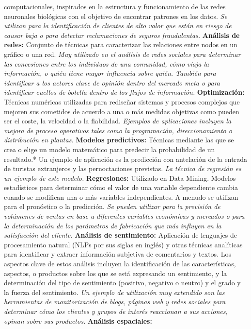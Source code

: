 \documentclass[
  letterpaper,
  DIV=11,
  numbers=noendperiod]{scrreprt}
\begin{document}
computacionales, inspirados en la estructura y funcionamiento de las
redes neuronales biológicas con el objetivo de encontrar patrones en los
datos. \emph{Se utilizan para la identificación de clientes de alto
valor que están en riesgo de causar baja o para detectar reclamaciones
de seguros fraudulentas.} \textbf{Análisis de redes:} Conjunto de
técnicas para caracterizar las relaciones entre nodos en un gráfico o
una red. \emph{Muy utilizado en el análisis de redes sociales para
determinar las concesiones entre los individuos de una comunidad, cómo
viaja la información, o quién tiene mayor influencia sobre quién.
También para identificar a los actores clave de opinión dentro del
mercado meta o para identificar cuellos de botella dentro de los flujos
de información.} \textbf{Optimización:} Técnicas numéricas utilizadas
para rediseñar sistemas y procesos complejos que mejoren sus cometidos
de acuerdo a una o más medidas objetivas como pueden ser el coste, la
velocidad o la fiabilidad. \emph{Ejemplos de aplicaciones incluyen la
mejora de proceso operativos tales como la programación,
direccionamiento o distribución en plantas.} \textbf{Modelos
predictivos:} Técnicas mediante las que se crea o elige un modelo
matemático para predecir la probabilidad de un resultado.* Un ejemplo de
aplicación es la predicción con antelación de la entrada de turistas
extranjeros y las pernoctaciones previstas. \emph{La técnica de
regresión es un ejemplo de este modelo.} \textbf{Regresiones:} Utilizado
en Data Mining. Modelos estadísticos para determinar cómo el valor de
una variable dependiente cambia cuando se modifican una o más variables
independientes. A menudo se utilizan para el pronóstico o la predicción.
\emph{Se pueden utilizar para la previsión de volúmenes de ventas en
base a diferentes variables económicas y mercados o para la
determinación de los parámetros de fabricación que más influyen en la
satisfacción del cliente.} \textbf{Análisis de sentimiento:} Aplicación
de lenguajes de procesamiento natural (NLPs por sus siglas en inglés) y
otras técnicas analíticas para identificar y extraer información
subjetiva de comentarios y textos. Los aspectos clave de estos análisis
incluyen la identificación de las características, aspectos, o productos
sobre los que se está expresando un sentimiento, y la determinación del
tipo de sentimiento (positivo, negativo o neutro) y el grado y la fuerza
del sentimiento. \emph{Un ejemplo de utilización muy extendido son las
herramientas de monitorización de blogs, páginas web y redes sociales
para determinar cómo los clientes y grupos de interés reaccionan a sus
acciones, opinan sobre sus productos.} \textbf{Análisis espaciales:}
\end{document}
